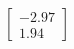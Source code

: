 \documentclass[preview]{standalone}
\begin{document}
\begin{align*}
\begin{bmatrix} -2.97 \\ 1.94 \end{bmatrix}
\end{align*}
\end{document}

